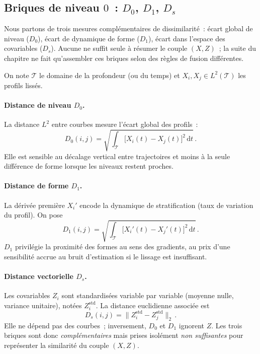 \documentclass[11pt,a4paper]{article}
\newcommand{\Ltwo}{L^2(\mathcal{T})}
\begin{document}
\subsection{Briques de niveau $0$~: $D_0$, $D_1$, $D_s$}
Nous partons de trois mesures complémentaires de dissimilarité~: écart global de niveau ($D_0$), écart de dynamique de forme ($D_1$), écart dans l'espace des covariables ($D_s$). Aucune ne suffit seule à résumer le couple $(X,Z)$~; la suite du chapitre ne fait qu'assembler ces briques selon des règles de fusion différentes.

On note $\mathcal{T}$ le domaine de la profondeur (ou du temps) et
$X_i,X_j\in \Ltwo$ les profils lissés.

\paragraph{Distance de niveau $D_0$.}
La distance $L^2$ entre courbes mesure l'écart global des profils~:
\begin{equation}
  D_0(i,j) = \sqrt{\int_{\mathcal{T}}
    \bigl[X_i(t)-X_j(t)\bigr]^2\,\mathrm{d}t } \, .
\end{equation}
Elle est sensible au décalage vertical entre trajectoires et moins à la seule
différence de forme lorsque les niveaux restent proches.

\paragraph{Distance de forme $D_1$.}
La dérivée première $X_i'$ encode la dynamique de stratification (taux de
variation du profil). On pose
\begin{equation}
  D_1(i,j) = \sqrt{\int_{\mathcal{T}}
    \bigl[X_i'(t)-X_j'(t)\bigr]^2\,\mathrm{d}t } \, .
\end{equation}
$D_1$ privilégie la proximité des formes au sens des gradients, au prix d'une
sensibilité accrue au bruit d'estimation si le lissage est insuffisant.

\paragraph{Distance vectorielle $D_s$.}
Les covariables $Z_i$ sont standardisées variable par variable (moyenne nulle,
variance unitaire), notées $Z_i^{\mathrm{std}}$. La distance euclidienne
associée est
\begin{equation}
  D_s(i,j) = \bigl\| Z_i^{\mathrm{std}} - Z_j^{\mathrm{std}} \bigr\|_2 \, .
\end{equation}
Elle ne dépend pas des courbes~; inversement, $D_0$ et $D_1$ ignorent $Z$.
Les trois briques sont donc \emph{complémentaires} mais prises isolément
\emph{non suffisantes} pour représenter la similarité du couple $(X,Z)$.
\end{document}
